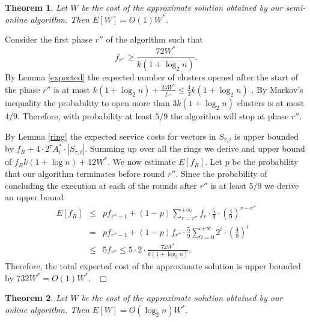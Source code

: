 \documentclass[11pt,twoside]{article}
\newtheorem{theorem}{Theorem}
\newenvironment{proof}{\medskip\noindent {\bf Proof.}}{~\hfill$\Box$\medskip}
\begin{document}
\begin{theorem}
Let $W$ be the cost of the approximate solution obtained by our  semi-online algorithm. Then $E[W]=O\left(1\right) W^*$.
\end{theorem}
\begin{proof}
Consider the first  phase $r''$ of the algorithm such that 
$$f_{r''}\ge \frac{72W^*}{k(1+\log_2 n)}.$$
By Lemma \ref{expected} the expected number of clusters opened  after the start of the  phase $r''$ is at most $k(1+\log_2n) +\frac{24W^*}{f_{r''}}\le \frac43 k(1+\log_2n)$ . By Markov's inequality the probability to open more than $3 k(1+\log_2n) $ clusters is at most $4/9$. Therefore, with probability at least $5/9$ the algorithm will stop at phase $r''$.

 
By Lemma \ref{ring} the expected service costs for vectors in $S_{\tau,i}$ is upper bounded by $f_R+ 4\cdot 2^{\tau}A_i^*\cdot |S_{\tau,i}|$. Summing up over all the rings we derive and upper bound of
$f_Rk(1+\log n)+ 12W^*$.
%
We now estimate $E[f_R]$. Let $p$ be the probability that our algorithm terminates before round $r''$. 
Since the probability of concluding the execution at each of the rounds after $r''$ is at least $5/9$ we derive an upper bound
\begin{eqnarray*}
E[f_R]&\le& p f_{r''-1} + (1-p)\sum_{r=r''}^{+\infty}f_r\cdot \frac59 \cdot \left(\frac49\right)^{r-r''}\\
&=&p f_{r''-1} + (1-p)f_{r''}\cdot \frac59\sum_{i=0}^{+\infty}2^i\cdot \left(\frac49\right)^i\\
&\le& 5f_{r''}  \le 5 \cdot 2\cdot \frac{72W^*}{k(1+\log_2 n)}.
\end{eqnarray*}
 Therefore, the total expected cost of the approximate solution is upper bounded by $ 732W^*=O(1)W^*$.
\end{proof}
\begin{theorem}
Let $W$ be the cost of the approximate solution obtained by our  online algorithm. Then $E[W]=O\left(\log_2 n\right) W^*$.
\end{theorem}
\end{document}

